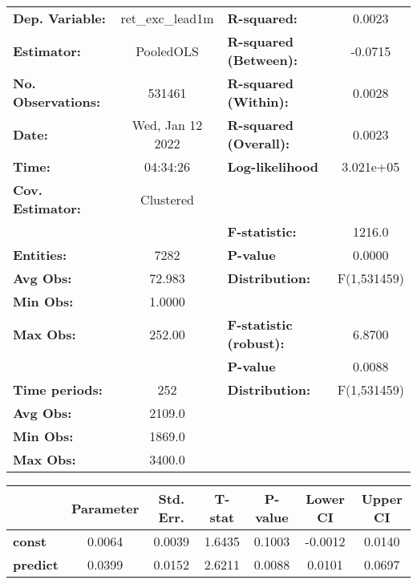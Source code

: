 \begin{center}
\begin{tabular}{lclc}
\toprule
\textbf{Dep. Variable:}    &  ret\_exc\_lead1m  & \textbf{  R-squared:         }   &      0.0023      \\
\textbf{Estimator:}        &     PooledOLS      & \textbf{  R-squared (Between):}  &     -0.0715      \\
\textbf{No. Observations:} &       531461       & \textbf{  R-squared (Within):}   &      0.0028      \\
\textbf{Date:}             &  Wed, Jan 12 2022  & \textbf{  R-squared (Overall):}  &      0.0023      \\
\textbf{Time:}             &      04:34:26      & \textbf{  Log-likelihood     }   &    3.021e+05     \\
\textbf{Cov. Estimator:}   &     Clustered      & \textbf{                     }   &                  \\
\textbf{}                  &                    & \textbf{  F-statistic:       }   &      1216.0      \\
\textbf{Entities:}         &        7282        & \textbf{  P-value            }   &      0.0000      \\
\textbf{Avg Obs:}          &       72.983       & \textbf{  Distribution:      }   &   F(1,531459)    \\
\textbf{Min Obs:}          &       1.0000       & \textbf{                     }   &                  \\
\textbf{Max Obs:}          &       252.00       & \textbf{  F-statistic (robust):} &      6.8700      \\
\textbf{}                  &                    & \textbf{  P-value            }   &      0.0088      \\
\textbf{Time periods:}     &        252         & \textbf{  Distribution:      }   &   F(1,531459)    \\
\textbf{Avg Obs:}          &       2109.0       & \textbf{                     }   &                  \\
\textbf{Min Obs:}          &       1869.0       & \textbf{                     }   &                  \\
\textbf{Max Obs:}          &       3400.0       & \textbf{                     }   &                  \\
\bottomrule
\end{tabular}
\begin{tabular}{lcccccc}
                 & \textbf{Parameter} & \textbf{Std. Err.} & \textbf{T-stat} & \textbf{P-value} & \textbf{Lower CI} & \textbf{Upper CI}  \\
\midrule
\textbf{const}   &       0.0064       &       0.0039       &      1.6435     &      0.1003      &      -0.0012      &       0.0140       \\
\textbf{predict} &       0.0399       &       0.0152       &      2.6211     &      0.0088      &       0.0101      &       0.0697       \\
\bottomrule
\end{tabular}
\end{center}
